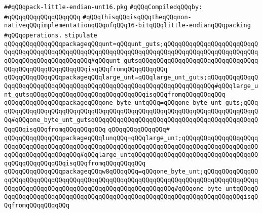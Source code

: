 \label{src/lib/std/src/pack-little-endian-unt16.pkg}
\verb|##qQQqpack-little-endian-unt16.pkg|\newline
\newline
\verb|#qQQqCompiledqQQqby:|\newline
\verb|#qQQqqQQqqQQqqQQqqQQq|\newline
\newline
\verb|#qQQqThisqQQqisqQQqtheqQQqnon-nativeqQQqimplementationqQQqofqQQq16-bitqQQqlittle-endianqQQqpacking|\newline
\verb|#qQQqoperations.|\newline
\newline
\verb|stipulate|\newline
\verb|qQQqqQQqqQQqqQQqpackageqQQqunt=qQQqunt_guts;qQQqqQQqqQQqqQQqqQQqqQQqqQQqqQQqqQQqqQQqqQQqqQQqqQQqqQQqqQQqqQQqqQQqqQQqqQQqqQQqqQQqqQQqqQQqqQQqqQQqqQQqqQQqqQQqqQQqqQQq#qQQqunt_gutsqQQqqQQqqQQqqQQqqQQqqQQqqQQqqQQqqQQqqQQqqQQqqQQqqQQqqQQqisqQQqfromqQQqqQQqqQQq|\newline
\verb|qQQqqQQqqQQqqQQqpackageqQQqlarge_unt=qQQqlarge_unt_guts;qQQqqQQqqQQqqQQqqQQqqQQqqQQqqQQqqQQqqQQqqQQqqQQqqQQqqQQqqQQqqQQqqQQqqQQq#qQQqlarge_unt_gutsqQQqqQQqqQQqqQQqqQQqqQQqqQQqqQQqisqQQqfromqQQqqQQqqQQq|\newline
\verb|qQQqqQQqqQQqqQQqpackageqQQqone_byte_untqQQq=qQQqone_byte_unt_guts;qQQqqQQqqQQqqQQqqQQqqQQqqQQqqQQqqQQqqQQqqQQqqQQqqQQqqQQqqQQqqQQqqQQqqQQqqQQq#qQQqone_byte_unt_gutsqQQqqQQqqQQqqQQqqQQqqQQqqQQqqQQqqQQqqQQqqQQqqQQqqQQqisqQQqfromqQQqqQQqqQQq|\newline
\verb|qQQqqQQqqQQqqQQq#|\newline
\verb|qQQqqQQqqQQqqQQqpackageqQQqlunqQQq=qQQqlarge_unt;qQQqqQQqqQQqqQQqqQQqqQQqqQQqqQQqqQQqqQQqqQQqqQQqqQQqqQQqqQQqqQQqqQQqqQQqqQQqqQQqqQQqqQQqqQQqqQQqqQQqqQQqqQQqqQQq#qQQqlarge_untqQQqqQQqqQQqqQQqqQQqqQQqqQQqqQQqqQQqqQQqqQQqqQQqqQQqisqQQqfromqQQqqQQqqQQq|\newline
\verb|qQQqqQQqqQQqqQQqpackageqQQqw8qQQqqQQq=qQQqone_byte_unt;qQQqqQQqqQQqqQQqqQQqqQQqqQQqqQQqqQQqqQQqqQQqqQQqqQQqqQQqqQQqqQQqqQQqqQQqqQQqqQQqqQQqqQQqqQQqqQQqqQQqqQQqqQQqqQQqqQQqqQQqqQQqqQQqqQQq#qQQqone_byte_untqQQqqQQqqQQqqQQqqQQqqQQqqQQqqQQqqQQqqQQqqQQqqQQqqQQqqQQqqQQqqQQqqQQqqQQqisqQQqfromqQQqqQQqqQQq|\newline
